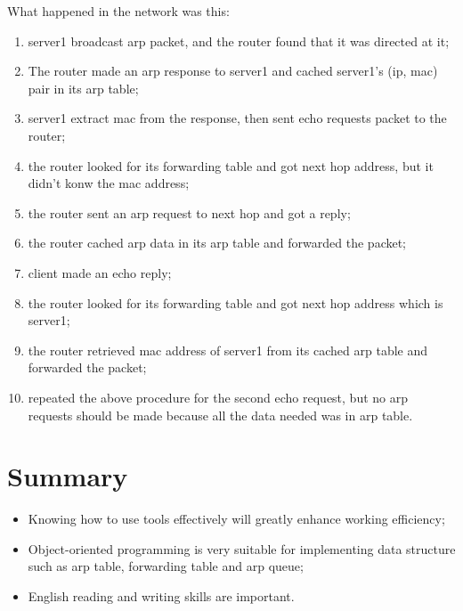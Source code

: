 \documentclass[12pt,a4paper,UTF8]{article}
\begin{document}
\newpage
What happened in the network was this:
\begin{enumerate}
	\item server1 broadcast arp packet, and the router found that it was directed at it;
	\item The router made an arp response to server1 and cached server1's (ip, mac) pair in its arp table;
	\item server1 extract mac from the response, then sent echo requests packet to the router;
	\item the router looked for its forwarding table and got next hop address, but it didn't konw the mac address;
	\item the router sent an arp request to next hop and got a reply;
	\item the router cached arp data in its arp table and forwarded the packet;
	\item client made an echo reply;
	\item the router looked for its forwarding table and got next hop address which is server1;
	\item the router retrieved mac address of server1 from its cached arp table and forwarded the packet;
	\item repeated the above procedure for the second echo request, but no arp requests should be made because all the data needed was in arp table.
\end{enumerate}


\section{Summary}
\begin{itemize}
	\item Knowing how to use tools effectively will greatly enhance working efficiency;
	\item Object-oriented programming is very suitable for implementing data structure such as arp table, forwarding table and arp queue;
	\item English reading and writing skills are important.
\end{itemize}
\end{document}
